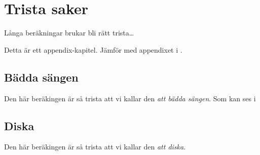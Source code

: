 \chapter{Trista saker}\label{cha:boring}
Långa beräkningar brukar bli rätt trista\dots

Detta är ett appendix-kapitel.  Jämför med appendixet i .

\section{Bädda sängen}

Den här beräkingen är så trista att vi kallar den \emph{att bädda sängen}.
Som kan ses i \citep{FlemingLeang}

\section{Diska}

Den här beräkingen är så trista att vi kallar den \emph{att diska}.
